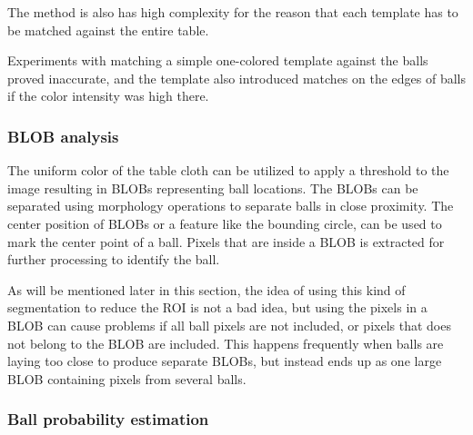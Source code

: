 The method is also has high complexity for the reason that each template has to be matched against the entire table.

Experiments with matching a simple one-colored template against the balls proved inaccurate, and the template also introduced matches on the edges of balls if the color intensity was high there.

\subsubsection{BLOB analysis}
The uniform color of the table cloth can be utilized to apply a threshold to the image resulting in BLOBs representing ball locations. The BLOBs can be separated using morphology operations to separate balls in close proximity. The center position of BLOBs or a feature like the bounding circle, can be used to mark the center point of a ball. Pixels that are inside a BLOB is extracted for further processing to identify the ball.

As will be mentioned later in this section, the idea of using this kind of segmentation to reduce the ROI is not a bad idea, but using the pixels in a BLOB can cause problems if all ball pixels are not included, or pixels that does not belong to the BLOB are included. This happens frequently when balls are laying too close to produce separate BLOBs, but instead ends up as one large BLOB containing pixels from several balls.

\subsubsection{Ball probability estimation}
